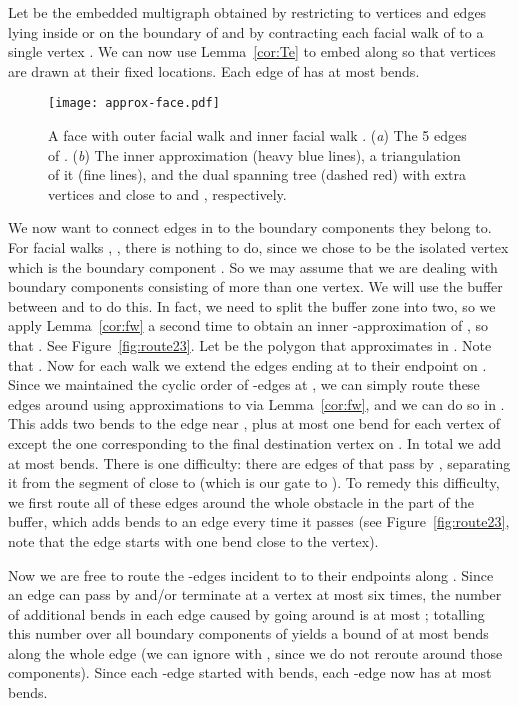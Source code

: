 \documentclass{llncs}
\begin{document}
Let  be the embedded multigraph obtained by restricting  to vertices and edges lying inside or on the boundary of  and by contracting each facial walk  of  to a single vertex . We can now use Lemma~\ref{cor:Te} to embed  along  so that vertices  are drawn at their fixed locations. Each edge of  has at most  bends.


\begin{figure}[tb]
\centering
\texttt{[image: approx-face.pdf]}
\caption{A face  with outer facial walk  and inner facial walk .  (\emph{a}) The 5 edges of .  (\emph{b}) The inner approximation  (heavy blue lines), a triangulation of it (fine lines), and the dual spanning tree (dashed red) with extra vertices  and  close to   and , respectively.}

\label{fig:route1}
\end{figure}

We now want to connect edges in  to the boundary components they belong to. For facial walks , , there is nothing to do, since we chose  to be the isolated vertex which is the boundary component . So we may assume that we are dealing with boundary components consisting of more than one vertex. We will use the buffer between  and  to do this. In fact, we need to split the buffer zone into two,  so we apply
Lemma~\ref{cor:fw} a second time to obtain an inner -approximation  of , so that . See Figure~\ref{fig:route23}. Let  be the polygon that approximates  in . Note that .
Now for each walk  we extend the edges ending at  to their endpoint on . Since we maintained the cyclic order of -edges at , we can simply route these edges around  using approximations to  via Lemma~\ref{cor:fw}, and we can do so in .
This adds two bends to the edge near , plus at most one bend for each vertex of  except the one corresponding to the final destination vertex on .  In total we add at most  bends.
There is one difficulty: there are edges of  that pass by , separating it from the segment of  close to  (which is our gate to ). To remedy this difficulty, we first route all of these edges around the whole obstacle  in the  part of the buffer, which adds  bends to an edge every time it passes  (see Figure~\ref{fig:route23}, note that the edge starts with one bend close to the vertex).



Now we are free to route the -edges incident to  to their endpoints along . Since an edge can pass by and/or terminate at a vertex at most six times, the number of additional bends in each edge caused by going around
 is at most ; totalling this number over all boundary components of  yields a bound of at most
 bends along the whole edge (we can ignore  with , since we do not reroute around those components). Since each -edge started with  bends, each -edge now has at most
 bends.
 
\end{document}
